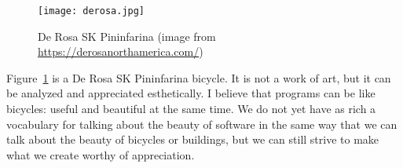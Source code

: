 \documentclass[10pt,letterpaper]{article}
\begin{document}
\begin{figure}
  \centering
  \texttt{[image: derosa.jpg]}
  \caption{De Rosa SK Pininfarina (image from \url{https://derosanorthamerica.com/})}
  \label{bicycle}
\end{figure}

Figure~\ref{bicycle} is a De Rosa SK Pininfarina bicycle.
It is not a work of art,
but it can be analyzed and appreciated esthetically.
I believe that programs can be like bicycles:
useful and beautiful at the same time.
We do not yet have as rich a vocabulary for talking about the beauty of software
in the same way that we can talk about the beauty of bicycles or buildings,
but we can still strive to make what we create worthy of appreciation.


\end{document}
